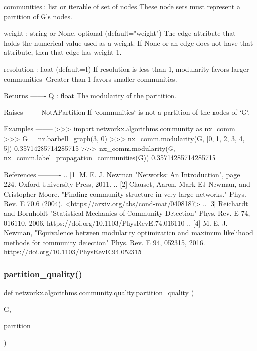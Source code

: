 \begin{DoxyVerb}
communities : list or iterable of set of nodes
    These node sets must represent a partition of G's nodes.

weight : string or None, optional (default="weight")
    The edge attribute that holds the numerical value used
    as a weight. If None or an edge does not have that attribute,
    then that edge has weight 1.

resolution : float (default=1)
    If resolution is less than 1, modularity favors larger communities.
    Greater than 1 favors smaller communities.

Returns
-------
Q : float
    The modularity of the paritition.

Raises
------
NotAPartition
    If `communities` is not a partition of the nodes of `G`.

Examples
--------
>>> import networkx.algorithms.community as nx_comm
>>> G = nx.barbell_graph(3, 0)
>>> nx_comm.modularity(G, [{0, 1, 2}, {3, 4, 5}])
0.35714285714285715
>>> nx_comm.modularity(G, nx_comm.label_propagation_communities(G))
0.35714285714285715

References
----------
.. [1] M. E. J. Newman "Networks: An Introduction", page 224.
   Oxford University Press, 2011.
.. [2] Clauset, Aaron, Mark EJ Newman, and Cristopher Moore.
   "Finding community structure in very large networks."
   Phys. Rev. E 70.6 (2004). <https://arxiv.org/abs/cond-mat/0408187>
.. [3] Reichardt and Bornholdt "Statistical Mechanics of Community Detection"
   Phys. Rev. E 74, 016110, 2006. https://doi.org/10.1103/PhysRevE.74.016110
.. [4] M. E. J. Newman, "Equivalence between modularity optimization and
   maximum likelihood methods for community detection"
   Phys. Rev. E 94, 052315, 2016. https://doi.org/10.1103/PhysRevE.94.052315\end{DoxyVerb}
 \mbox{\label{namespacenetworkx_1_1algorithms_1_1community_1_1quality_aa9e2006990248b86a41d5e9f776cd3fc}} 
\subsubsection{\texorpdfstring{partition\+\_\+quality()}{partition\_quality()}}
{\footnotesize\ttfamily def networkx.\+algorithms.\+community.\+quality.\+partition\+\_\+quality (\begin{DoxyParamCaption}\item[{}]{G,  }\item[{}]{partition }\end{DoxyParamCaption})}

